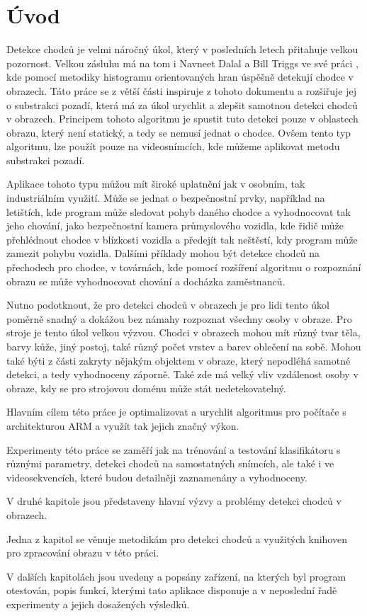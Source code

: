 \section{Úvod}
Detekce chodců je velmi náročný úkol, který v posledních letech přitahuje velkou pozornost. Velkou zásluhu má na tom i Navneet Dalal a Bill Triggs ve své práci \cite{hog:dalal}, kde pomocí metodiky histogramu orientovaných hran úspěšně detekují chodce v obrazech. Táto práce se z větší části inspiruje z tohoto dokumentu a rozšiřuje jej o substrakci pozadí, která má za úkol urychlit a zlepšit samotnou detekci chodců v obrazech.  Principem tohoto algoritmu je spustit tuto detekci pouze v oblastech obrazu, který není statický, a tedy se nemusí jednat o chodce. Ovšem tento typ algoritmu, lze použít pouze na videosnímcích, kde můžeme aplikovat metodu substrakci pozadí.

Aplikace tohoto typu můžou mít široké uplatnění jak v osobním, tak industriálním využití. Může se jednat o bezpečnostní prvky, například na letištích, kde program může sledovat pohyb daného chodce a vyhodnocovat tak jeho chování, jako bezpečnostní kamera průmyslového vozidla, kde řidič může přehlédnout chodce v blízkosti vozidla a předejít tak neštěstí, kdy program může zamezit pohybu vozidla. Dalšími příklady mohou být detekce chodců na přechodech pro chodce, v továrnách, kde pomocí rozšíření algoritmu o rozpoznání obrazu se může vyhodnocovat chování a docházka zaměstnanců. 

Nutno podotknout, že pro detekci chodců v obrazech je pro lidi tento úkol poměrně snadný a dokážou bez námahy rozpoznat všechny osoby v obraze. Pro stroje je tento úkol velkou výzvou. Chodci v obrazech mohou mít různý tvar těla, barvy kůže, jiný postoj, také různý počet vrstev a barev oblečení na sobě. Mohou také býti z části zakryty nějakým objektem v obraze, který nepodléhá samotné detekci, a tedy vyhodnoceny záporně. Také zde má velký vliv vzdálenost osoby v obraze, kdy se pro strojovou doménu může stát nedetekovatelný. 

Hlavním cílem této práce je optimalizovat a urychlit algoritmus pro počítače s architekturou ARM a využít tak jejich značný výkon. 

Experimenty této práce se zaměří jak na trénování a testování klasifikátoru s různými parametry, detekci chodců na samostatných snímcích, ale také i ve videosekvencích, které budou detailněji zaznamenány a vyhodnoceny. 

V druhé kapitole jsou představeny hlavní výzvy a problémy detekci chodců v obrazech.

Jedna z kapitol se věnuje metodikám pro detekci chodců a využitých knihoven pro zpracování obrazu v této práci. 

V dalších kapitolách jsou uvedeny a popsány zařízení, na kterých byl program otestován, popis funkcí, kterými tato aplikace disponuje a v neposlední řadě experimenty a jejich dosažených výsledků. 